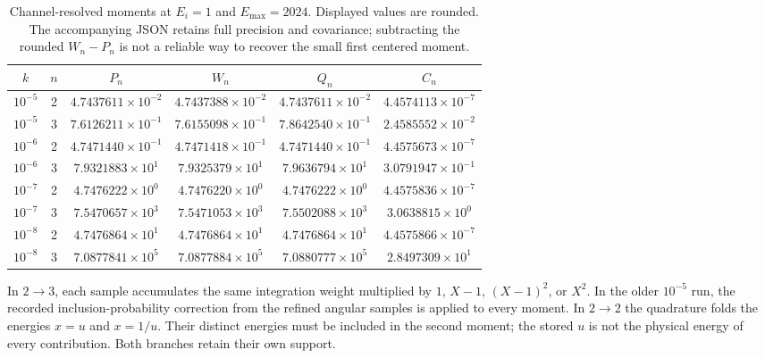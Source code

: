 \documentclass[10pt,a4paper]{article}
\begin{document}
\begin{table}[h!]
\centering\scriptsize
\caption{Channel-resolved moments at $E_i=1$ and $E_{\max}=2024$.
Displayed values are rounded. The accompanying JSON retains full
precision and covariance; subtracting the rounded $W_n-P_n$ is not a
reliable way to recover the small first centered moment.}
\label{tab:moments}
\begin{tabular}{cccccc}
\toprule
$k$ & $n$ & $P_n$ & $W_n$ & $Q_n$ & $C_n$\\
\midrule
$10^{-5}$ & 2 & $4.7437611\times10^{-2}$ & $4.7437388\times10^{-2}$ & $4.7437611\times10^{-2}$ & $4.4574113\times10^{-7}$\\
$10^{-5}$ & 3 & $7.6126211\times10^{-1}$ & $7.6155098\times10^{-1}$ & $7.8642540\times10^{-1}$ & $2.4585552\times10^{-2}$\\
$10^{-6}$ & 2 & $4.7471440\times10^{-1}$ & $4.7471418\times10^{-1}$ & $4.7471440\times10^{-1}$ & $4.4575673\times10^{-7}$\\
$10^{-6}$ & 3 & $7.9321883\times10^{1}$ & $7.9325379\times10^{1}$ & $7.9636794\times10^{1}$ & $3.0791947\times10^{-1}$\\
$10^{-7}$ & 2 & $4.7476222\times10^{0}$ & $4.7476220\times10^{0}$ & $4.7476222\times10^{0}$ & $4.4575836\times10^{-7}$\\
$10^{-7}$ & 3 & $7.5470657\times10^{3}$ & $7.5471053\times10^{3}$ & $7.5502088\times10^{3}$ & $3.0638815\times10^{0}$\\
$10^{-8}$ & 2 & $4.7476864\times10^{1}$ & $4.7476864\times10^{1}$ & $4.7476864\times10^{1}$ & $4.4575866\times10^{-7}$\\
$10^{-8}$ & 3 & $7.0877841\times10^{5}$ & $7.0877884\times10^{5}$ & $7.0880777\times10^{5}$ & $2.8497309\times10^{1}$\\
\bottomrule
\end{tabular}
\end{table}

In $2\to3$, each sample accumulates the same integration weight
multiplied by $1$, $X-1$, $(X-1)^2$, or $X^2$. In the older $10^{-5}$
run, the recorded inclusion-probability correction from the refined
angular samples is applied to every moment. In $2\to2$ the quadrature
folds the energies $x=u$ and $x=1/u$. Their distinct energies must be
included in the second moment; the stored $u$ is not the physical
energy of every contribution. Both branches retain their own support.
\end{document}
